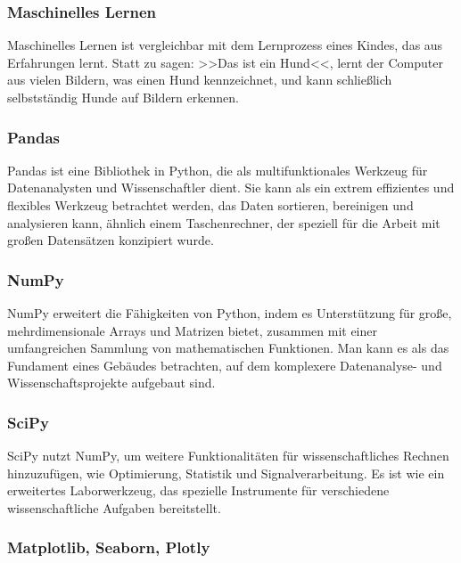 \documentclass{vorlage-design-main}
\begin{document}
\subsubsection{Maschinelles Lernen}\label{maschinelles-lernen}

Maschinelles Lernen ist vergleichbar mit dem Lernprozess eines Kindes,
das aus Erfahrungen lernt. Statt zu sagen: >>Das ist ein Hund<<, lernt
der Computer aus vielen Bildern, was einen Hund kennzeichnet, und kann
schließlich selbstständig Hunde auf Bildern erkennen.

\subsubsection{Pandas}\label{pandas}

Pandas ist eine Bibliothek in Python, die als multifunktionales Werkzeug
für Datenanalysten und Wissenschaftler dient. Sie kann als ein extrem
effizientes und flexibles Werkzeug betrachtet werden, das Daten
sortieren, bereinigen und analysieren kann, ähnlich einem
Taschenrechner, der speziell für die Arbeit mit großen Datensätzen
konzipiert wurde.

\subsubsection{NumPy}\label{numpy}

NumPy erweitert die Fähigkeiten von Python, indem es Unterstützung für
große, mehrdimensionale Arrays und Matrizen bietet, zusammen mit einer
umfangreichen Sammlung von mathematischen Funktionen. Man kann es als
das Fundament eines Gebäudes betrachten, auf dem komplexere
Datenanalyse- und Wissenschaftsprojekte aufgebaut sind.

\subsubsection{SciPy}\label{scipy}

SciPy nutzt NumPy, um weitere Funktionalitäten für wissenschaftliches
Rechnen hinzuzufügen, wie Optimierung, Statistik und Signalverarbeitung.
Es ist wie ein erweitertes Laborwerkzeug, das spezielle Instrumente für
verschiedene wissenschaftliche Aufgaben bereitstellt.

\subsubsection{Matplotlib, Seaborn,
Plotly}\label{matplotlib-seaborn-plotly}
\end{document}
